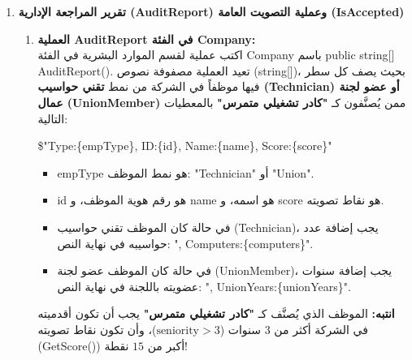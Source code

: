 \documentclass[14pt]{extarticle}
\begin{document}
\begin{enumerate}[label=\textbf{تمرين \arabic*:}, wide=0pt, itemsep=2.2em]
    \item \textbf{تقرير المراجعة الإدارية (\textenglish{AuditReport}) وعملية التصويت العامة (\textenglish{IsAccepted})}
    \begin{enumerate}[label=\textbf{(\arabic*)}]
        \item \textbf{العملية \textenglish{AuditReport} في الفئة \textenglish{Company}:} \\
        اكتب عملية لقسم الموارد البشرية في الفئة \textenglish{Company} باسم \textenglish{public string[] AuditReport()}. تعيد العملية مصفوفة نصوص (\textenglish{string[]})، بحيث يصف كل سطر فيها موظفاً في الشركة من نمط \textbf{تقني حواسيب (\textenglish{Technician}) أو عضو لجنة عمال (\textenglish{UnionMember})} ممن يُصنَّفون كـ \textbf{"كادر تشغيلي متمرس"} بالمعطيات التالية:
        \begin{center}
        \textenglish{\$"Type:\{empType\}, ID:\{id\}, Name:\{name\}, Score:\{score\}"}
        \end{center}
        \begin{itemize}
            \item \textenglish{empType} هو نمط الموظف: \textenglish{"Technician"} أو \textenglish{"Union"}.
            \item \textenglish{id} هو رقم هوية الموظف، و \textenglish{name} هو اسمه، و \textenglish{score} هو نقاط تصويته.
            \item في حالة كان الموظف تقني حواسيب (\textenglish{Technician})، يجب إضافة عدد حواسيبه في نهاية النص: \textenglish{", Computers:\{computers\}"}.
            \item في حالة كان الموظف عضو لجنة (\textenglish{UnionMember})، يجب إضافة سنوات عضويته باللجنة في نهاية النص: \textenglish{", UnionYears:\{unionYears\}"}.
        \end{itemize}
        \textbf{انتبه:} الموظف الذي يُصنَّف كـ \textbf{"كادر تشغيلي متمرس"} يجب أن تكون أقدميته في الشركة أكثر من $3$ سنوات ($\text{seniority} > 3$)، وأن تكون نقاط تصويته (\textenglish{GetScore()}) أكبر من $15$ نقطة!


\end{enumerate}
\end{enumerate}
\end{document}

